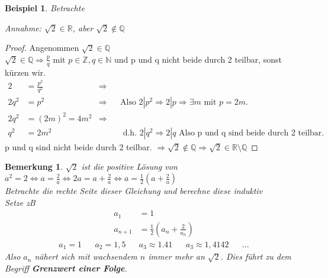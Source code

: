 \documentclass[a4paper,titlepage,oneside]{article}
\def\N{\ensuremath{\mathbb{N}} }
\def\Q{\ensuremath{\mathbb{Q}} }
\def\Z{\ensuremath{\mathbb{Z}} }
\def\R{\ensuremath{\mathbb{R}} }
\def\WSP{\text{Widerspruch! }}
\theoremstyle{thmstyle}
\newtheorem{bsp}[satz]{Beispiel}
\newtheorem{bem}[satz]{Bemerkung}
\begin{document}
\begin{bsp} 
Betrachte 
\begin{center}  \end{center}
Annahme: \( \sqrt{2} \in \R\), aber \(\sqrt{2} \not\in \Q\)
\end{bsp}
\begin{proof} Angenommen $\displaystyle \sqrt{2} \in \Q$ \\
$ \displaystyle \sqrt{2} \in \Q \Rightarrow \frac{p}{q} \text{ mit }p \in \Z, q \in \N $ und p und q nicht beide durch 2 teilbar, sonst kürzen wir.
\begin{align*}
2 &= \frac{p^2}{q^2} &\Rightarrow\\
2q^2 &= p^2 &\Rightarrow &&\text{Also } 2 | p^2 \Rightarrow 2 | p \Rightarrow \exists m \text{ mit } p = 2 m. \\
2q^2 &= (2m)^2 = 4m^2 &\Rightarrow \\
q^2 &= 2m^2 & &&\text{ d.h. } 2 | q^2 \Rightarrow 2 | q \text{ Also p und q sind beide durch 2 teilbar.}
\end{align*}
 \WSP p und q sind nicht beide durch 2 teilbar. $\displaystyle \Rightarrow \sqrt{2} \not\in \Q \Rightarrow \sqrt{2} \in \R\setminus\Q$
\end{proof}

\begin{bem}
\( \sqrt{2} \) ist die positive Lösung von $ \displaystyle a^2 = 2 \Leftrightarrow a = \frac{2}{a} \Leftrightarrow  2a = a + \frac{2}{a} \Leftrightarrow a= \frac{1}{2}\left(a + \frac{2}{a}\right)$ \\
Betrachte die rechte Seite dieser Gleichung und berechne diese induktiv\\
Setze zB
\begin{align*}
a_1 &= 1\\
a_{n+1} &= \frac{1}{2}\left(a_n + \frac{2}{a_n}\right)
\end{align*}
\begin{align*}
a_1 = 1 && a_2 = 1,5 && a_3 \approx 1.41 && a_3 \approx 1,4142 &&\dots 
\end{align*}
Also \(a_n\) nähert sich mit wachsendem \(n\) immer mehr an \(\sqrt{2}\). Dies führt zu dem Begriff \textbf{Grenzwert einer Folge}.
\end{bem}
\end{document}
